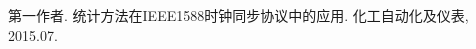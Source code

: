 
\begin{publications}{99}
    \item\textsc{第一作者}. {统计方法在IEEE1588时钟同步协议中的应用}. 化工自动化及仪表, 2015.07.
\end{publications}
